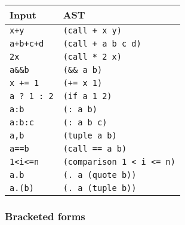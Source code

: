 \begin{table}[h]

\begin{tabulary}{\linewidth}{|L|L|}
\hline
Input & AST \\
\hline
\texttt{x+y} & \texttt{(call + x y)} \\
\hline
\texttt{a+b+c+d} & \texttt{(call + a b c d)} \\
\hline
\texttt{2x} & \texttt{(call * 2 x)} \\
\hline
\texttt{a\&\&b} & \texttt{(\&\& a b)} \\
\hline
\texttt{x += 1} & \texttt{(+= x 1)} \\
\hline
\texttt{a ? 1 : 2} & \texttt{(if a 1 2)} \\
\hline
\texttt{a:b} & \texttt{(: a b)} \\
\hline
\texttt{a:b:c} & \texttt{(: a b c)} \\
\hline
\texttt{a,b} & \texttt{(tuple a b)} \\
\hline
\texttt{a==b} & \texttt{(call == a b)} \\
\hline
\texttt{1<i<=n} & \texttt{(comparison 1 < i <= n)} \\
\hline
\texttt{a.b} & \texttt{(. a (quote b))} \\
\hline
\texttt{a.(b)} & \texttt{(. a (tuple b))} \\
\hline
\end{tabulary}

\end{table}



\hypertarget{15884526073773577025}{}


\subsubsection{Bracketed forms}




